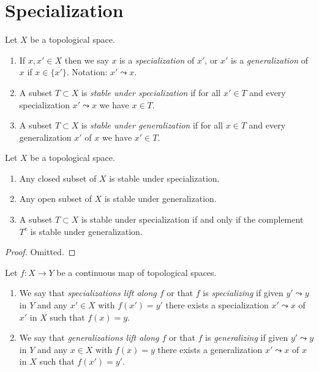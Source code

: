 \section{Specialization}
\label{section-specialization}

\begin{definition}
\label{definition-specialization}
Let $X$ be a topological space.
\begin{enumerate}
\item If $x, x' \in X$ then we say $x$ is a {\it specialization} of $x'$,
or $x'$ is a {\it generalization} of $x$ if $x \in \overline{\{x'\}}$.
Notation: $x' \leadsto x$.
\item A subset $T \subset X$ is {\it stable under specialization}
if for all $x' \in T$ and every specialization $x' \leadsto x$ we have
$x \in T$.
\item A subset $T \subset X$ is {\it stable under generalization}
if for all $x \in T$ and every generalization $x'$ of $x$ we have
$x' \in T$.
\end{enumerate}
\end{definition}

\begin{lemma}
\label{lemma-open-closed-specialization}
Let $X$ be a topological space.
\begin{enumerate}
\item Any closed subset of $X$ is stable under specialization.
\item Any open subset of $X$ is stable under generalization.
\item A subset $T \subset X$ is stable under specialization
if and only if
the complement $T^c$ is stable under generalization.
\end{enumerate}
\end{lemma}

\begin{proof}
Omitted.
\end{proof}

\begin{definition}
\label{definition-lift-specializations}
Let $f : X \to Y$ be a continuous map of topological spaces.
\begin{enumerate}
\item We say that {\it specializations lift along $f$} or that $f$ is
{\it specializing} if given $y' \leadsto y$ in $Y$ and any $x'\in X$ with
$f(x') = y'$ there exists a specialization $x' \leadsto x$ of $x'$ in $X$ such
that $f(x) = y$.
\item We say that {\it generalizations lift along $f$} or that $f$ is
{\it generalizing} if given $y' \leadsto y$ in $Y$ and any $x\in X$ with
$f(x) = y$ there exists a generalization $x' \leadsto x$ of $x$ in $X$ such
that $f(x') = y'$.
\end{enumerate}
\end{definition}

